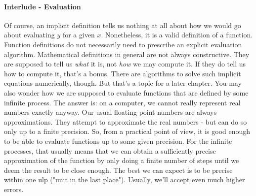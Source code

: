 




\paragraph{Interlude - Evaluation}
Of course, an implicit definition tells us nothing at all about how we would go about evaluating $y$ for a given $x$. Nonetheless, it is a valid definition of a function. Function definitions do not necessarily need to prescribe an explicit evaluation algorithm. Mathematical definitions in general are not always constructive. They are supposed to tell us \emph{what} it is, not \emph{how} we may compute it. If they do tell us how to compute it, that's a bonus. There are algorithms to solve such implicit equations numerically, though. But that's a topic for a later chapter. You may also wonder how we are supposed to evaluate functions that are defined by some infinite process. The answer is: on a computer, we cannot really represent real numbers exactly anyway. Our usual floating point numbers are always approximations. They attempt to approximate the real numbers - but can do so only up to a finite precision. So, from a practical point of view, it is good enough to be able to evaluate functions up to some given precision. For the infinite processes, that usually means that we can obtain a sufficiently precise approximation of the function by only doing a finite number of steps until we deem the result to be close enough. The best we can expect is to be precise within one ulp ("unit in the last place"). Usually, we'll accept even much higher errors.

